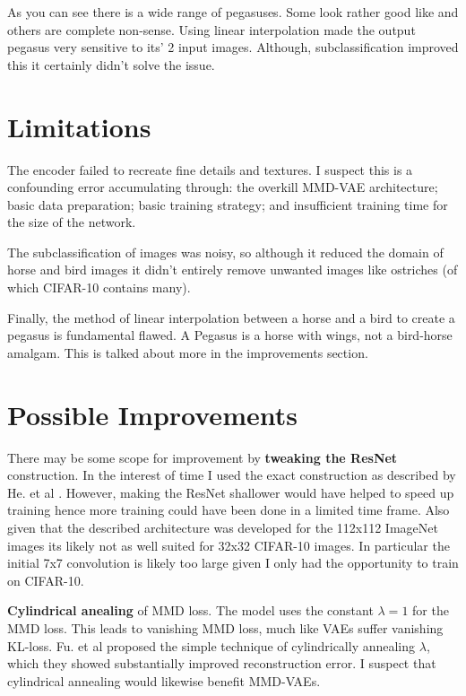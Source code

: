 \documentclass{article}
\begin{document}
As you can see there is a wide range of pegasuses. Some look rather good like and others are complete non-sense. Using linear interpolation made the output pegasus very sensitive to its' 2 input images. Although, subclassification improved this it certainly didn't solve the issue.  

\section{Limitations}
The encoder failed to recreate fine details and textures. I suspect this is a confounding error accumulating through: the overkill MMD-VAE architecture; basic data preparation; basic training strategy; and insufficient training time for the size of the network.

The subclassification of images was noisy, so although it reduced the domain of horse and bird images it didn't entirely remove unwanted images like ostriches (of which CIFAR-10 contains many). 

Finally, the method of linear interpolation between a horse and a bird to create a pegasus is fundamental flawed. A Pegasus is a horse with wings, not a bird-horse amalgam. This is talked about more in the improvements section.  



\section{Possible Improvements}
There may be some scope for improvement by \textbf{tweaking the ResNet} construction. In the interest of time I used the exact construction as described by He. et al \cite{ResNet}. However, making the ResNet shallower would have helped to speed up training hence more training could have been done in a limited time frame. Also given that the described architecture was developed for the 112x112 ImageNet images its likely not as well suited for 32x32 CIFAR-10 images. In particular the initial 7x7 convolution is likely too large given I only had the opportunity to train on CIFAR-10.

\textbf{Cylindrical anealing} of MMD loss. The model uses the constant $\lambda=1$ for the MMD loss. This leads to vanishing MMD loss, much like VAEs suffer vanishing KL-loss. Fu. et al \cite{cylindricalAnnealing} proposed the simple technique of cylindrically annealing $\lambda$, which they showed substantially improved reconstruction error. I suspect that cylindrical annealing would likewise benefit MMD-VAEs.
\end{document}
